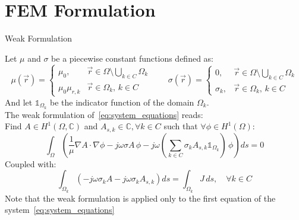 \documentclass[aspectratio=54,xcolor=dvipsnames]{beamer}
\begin{document}
\section{FEM Formulation}
\begin{frame}{Weak Formulation}
    \begin{footnotesize}
    Let $\mu$ and $\sigma$ be a piecewise constant functions defined as:
    \[
    \mu(\vec{r}) = 
    \begin{cases}
        \mu_0, & \vec{r} \in \Omega \setminus \bigcup_{k \in C} \Omega_k \\
        \mu_0\mu_{r,k} & \vec{r} \in \Omega_k, \, k \in C
    \end{cases}
    \qquad
    \sigma(\vec{r}) = 
    \begin{cases}
        0, & \vec{r} \in \Omega \setminus \bigcup_{k \in C} \Omega_k \\
        \sigma_k, & \vec{r} \in \Omega_k, \, k \in C
    \end{cases}
    \]
    And let $\mathds{1}_{\Omega_k}$ be the indicator function of the domain $\Omega_k$. \\
    The weak formulation of~\eqref{eq:system_equations} reads: \\
    Find $A \in H^1(\Omega, \mathbb{C})$ and $A_{s,k} \in \mathbb{C}, \forall k \in C$ such that $\forall \phi \in H^1(\Omega)$:
    \begin{equation} 
        \int_{\Omega} \left( \frac{1}{\mu} \nabla A \cdot \nabla \phi - j\omega \sigma A \, \phi - j\omega \left(\sum_{k \in C} \sigma_k A_{s,k} \mathds{1}_{\Omega_k} \right) \, \phi \right) ds = 0
        \label{eq:weak_formulation}
    \end{equation}
    Coupled with:
    \begin{equation}
        \int_{\Omega_k} \left(- j\omega \sigma_k A - j\omega \sigma_k A_{s,k} \right) ds = \int_{\Omega_k} J \, ds, \quad \forall k \in C
        \label{eq:current_constraint_weak}
    \end{equation}
    Note that the weak formulation is applied only to the first equation of the system~\eqref{eq:system_equations}
    \end{footnotesize}
\end{frame}
\end{document}
